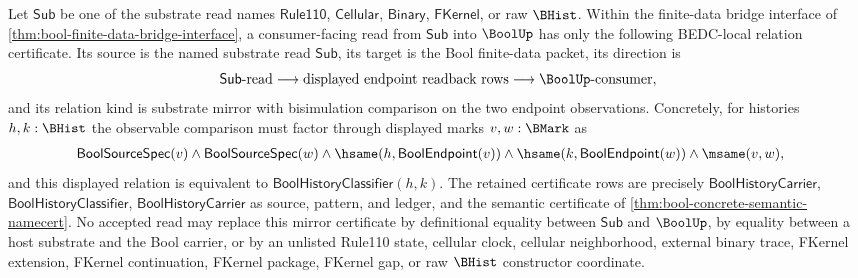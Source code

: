 \begin{lemma}
\label{lem:bool-finite-data-substrate-bisimulation-boundary}
Let $\mathsf{Sub}$ be one of the substrate read names
$\mathsf{Rule110}$, $\mathsf{Cellular}$, $\mathsf{Binary}$,
$\mathsf{FKernel}$, or raw $\BHist$. Within the finite-data bridge interface of
\autoref{thm:bool-finite-data-bridge-interface}, a consumer-facing read from
$\mathsf{Sub}$ into $\BoolUp$ has only the following BEDC-local relation
certificate. Its source is the named substrate read $\mathsf{Sub}$, its target
is the Bool finite-data packet, its direction is
$$
  \mathsf{Sub}\text{-read}
  \longrightarrow
  \text{displayed endpoint readback rows}
  \longrightarrow
  \BoolUp\text{-consumer},
$$
and its relation kind is substrate mirror with bisimulation comparison on the
two endpoint observations. Concretely, for histories $h,k:\BHist$ the observable
comparison must factor through displayed marks $v,w:\BMark$ as
$$
\begin{aligned}
&\mathsf{BoolSourceSpec}(v)
\land
\mathsf{BoolSourceSpec}(w)
\land
\hsame(h,\mathsf{BoolEndpoint}(v))
\land
\hsame(k,\mathsf{BoolEndpoint}(w))
\land
\msame(v,w),
\end{aligned}
$$
and this displayed relation is equivalent to
$\mathsf{BoolHistoryClassifier}(h,k)$. The retained certificate rows are
precisely $\mathsf{BoolHistoryCarrier}$, $\mathsf{BoolHistoryClassifier}$,
$\mathsf{BoolHistoryCarrier}$ as source, pattern, and ledger, and the semantic
certificate of \autoref{thm:bool-concrete-semantic-namecert}. No accepted read
may replace this mirror certificate by definitional equality between
$\mathsf{Sub}$ and $\BoolUp$, by equality between a host substrate and the Bool
carrier, or by an unlisted Rule110 state, cellular clock, cellular neighborhood,
external binary trace, FKernel extension, FKernel continuation, FKernel package,
FKernel gap, or raw $\BHist$ constructor coordinate.
\end{lemma}
